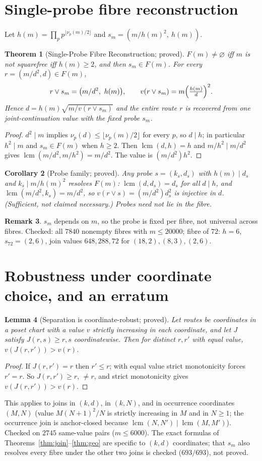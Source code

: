 \documentclass[11pt,a4paper]{article}
\newtheorem{theorem}{Theorem}[section]
\newtheorem{lemma}[theorem]{Lemma}
\newtheorem{corollary}[theorem]{Corollary}
\theoremstyle{definition}
\newtheorem{remark}[theorem]{Remark}
\newcommand{\lcm}{\operatorname{lcm}}
\newcommand{\vj}{\mathbin{\vee}}
\begin{document}
\section{Single-probe fibre reconstruction}
Let $h(m)=\prod_pp^{\lfloor\nu_p(m)/2\rfloor}$ and $s_m=(m/h(m)^2,\ h(m))$.
\begin{theorem}[Single-Probe Fibre Reconstruction; proved]\label{thm:single}
$F(m)\ne\varnothing$ iff $m$ is not squarefree iff $h(m)\ge2$, and then $s_m\in F(m)$. For every $r=(m/d^2,d)\in F(m)$,
\[ r\vj s_m=\bigl(m/d^2,\ h(m)\bigr),\qquad v(r\vj s_m)=m\Bigl(\tfrac{h(m)}{d}\Bigr)^{2}. \]
Hence $d=h(m)\sqrt{m/v(r\vj s_m)}$ and the entire route $r$ is recovered from one joint-continuation value with the fixed probe $s_m$.
\end{theorem}
\begin{proof}
$d^2\mid m$ implies $\nu_p(d)\le\lfloor\nu_p(m)/2\rfloor$ for every $p$, so $d\mid h$; in particular $h^2\mid m$ and $s_m\in F(m)$ when $h\ge2$. Then $\lcm(d,h)=h$ and $m/h^2\mid m/d^2$ gives $\lcm(m/d^2,m/h^2)=m/d^2$. The value is $(m/d^2)h^2$.
\end{proof}
\begin{corollary}[Probe family; proved]
Any probe $s=(k_s,d_s)$ with $h(m)\mid d_s$ and $k_s\mid m/h(m)^2$ resolves $F(m)$: $\lcm(d,d_s)=d_s$ for all $d\mid h$, and $\lcm(m/d^2,k_s)=m/d^2$, so $v(r\vj s)=(m/d^2)d_s^2$ is injective in $d$. (Sufficient, not claimed necessary.) Probes need not lie in the fibre.
\end{corollary}
\begin{remark}
$s_m$ depends on $m$, so the probe is fixed per fibre, not universal across fibres. Checked: all $7840$ nonempty fibres with $m\le 20000$; fibre of $72$: $h=6$, $s_{72}=(2,6)$, join values $648,288,72$ for $(18,2),(8,3),(2,6)$.
\end{remark}

\section{Robustness under coordinate choice, and an erratum}
\begin{lemma}[Separation is coordinate-robust; proved]\label{lem:robust}
Let routes be coordinates in a poset chart with a value $v$ strictly increasing in each coordinate, and let $J$ satisfy $J(r,s)\ge r,s$ coordinatewise. Then for distinct $r,r'$ with equal value, $v(J(r,r'))>v(r)$.
\end{lemma}
\begin{proof}
If $J(r,r')=r$ then $r'\le r$; with equal value strict monotonicity forces $r'=r$. So $J(r,r')\ge r$, $\ne r$, and strict monotonicity gives $v(J(r,r'))>v(r)$.
\end{proof}
This applies to joins in $(k,d)$, in $(k,N)$, and in occurrence coordinates $(M,N)$ (value $M(N+1)^2/N$ is strictly increasing in $M$ and in $N\ge1$; the occurrence join is anchor-closed because $\lcm(N,N')\mid\lcm(M,M')$). Checked on $2745$ same-value pairs ($m\le6000$). The exact formulas of Theorems~\ref{thm:join}--\ref{thm:geo} are specific to $(k,d)$ coordinates; that $s_m$ also resolves every fibre under the other two joins is checked ($693/693$), not proved.
\end{document}

